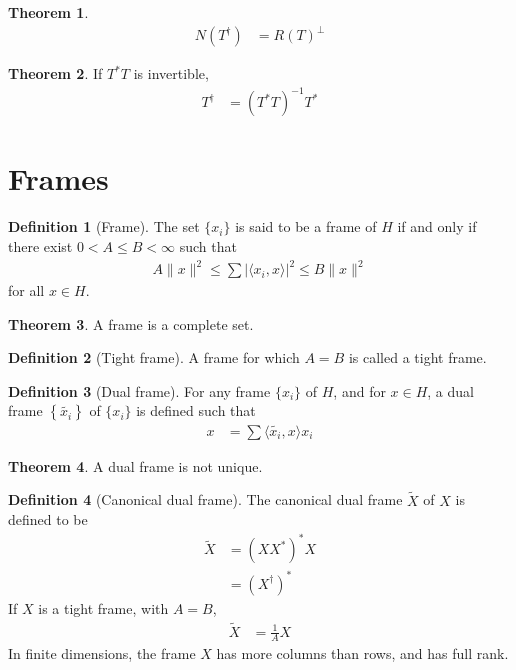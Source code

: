 \documentclass[titlepage, fleqn, a4paper, 12pt, twoside]{article}
\theoremstyle{definition}
\newtheorem{definition}{Definition}
\theoremstyle{theorem}
\newtheorem{theorem}{Theorem}
\renewcommand{\tilde}{\widetilde}
\begin{document}
\begin{theorem}
	\begin{align*}
		N\left( T^{\dagger} \right) &= R(T)^{\perp}
	\end{align*}
\end{theorem}

\begin{theorem}
	If $T^* T$ is invertible,
	\begin{align*}
		T^{\dagger} &= \left( T^* T \right)^{-1} T^*
	\end{align*}
\end{theorem}

\section{Frames}

\begin{definition}[Frame]
	The set $\{x_i\}$ is said to be a frame of $H$ if and only if there exist $0 < A \le B < \infty$ such that
	\begin{eqnarray*}
		A \|x\|^2 \le \sum \left| \langle x_i,x \rangle \right|^2 \le B \|x\|^2
	\end{eqnarray*}
	for all $x \in H$.
\end{definition}

\begin{theorem}
	A frame is a complete set.
\end{theorem}

\begin{definition}[Tight frame]
	A frame for which $A = B$ is called a tight frame.
\end{definition}

\begin{definition}[Dual frame]
	For any frame $\{x_i\}$ of $H$, and for $x \in H$, a dual frame $\left\{ \tilde{x_i} \right\}$ of $\{x_i\}$ is defined such that
	\begin{align*}
		x &= \sum \langle \tilde{x_i},x \rangle x_i
	\end{align*}
\end{definition}

\begin{theorem}
	A dual frame is not unique.
\end{theorem}

\begin{definition}[Canonical dual frame]
	The canonical dual frame $\tilde{X}$ of $X$ is defined to be
	\begin{align*}
		\tilde{X} &= \left( X X^* \right)^* X\\
		&= \left( X^{\dagger} \right)^*
	\end{align*}
	If $X$ is a tight frame, with $A = B$,
	\begin{align*}
		\tilde{X} &= \frac{1}{A} X
	\end{align*}
	In finite dimensions, the frame $X$ has more columns than rows, and has full rank.
\end{definition}
\end{document}
